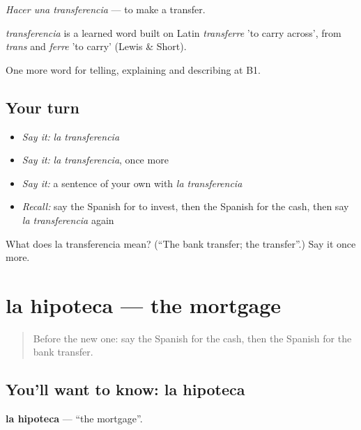 \emph{Hacer una transferencia} — to make a transfer.

\begin{cousinweb}
\emph{transferencia} is a learned word built on Latin \emph{transferre} 'to carry across', from \emph{trans} and \emph{ferre} 'to carry' (Lewis \& Short).
\end{cousinweb}

\begin{grammarlens}[title={What you've built}]
One more word for telling, explaining and describing at B1.
\end{grammarlens}

\subsection*{Your turn}
\begin{itemize}
\raggedright
  \item \emph{Say it:} \emph{la transferencia}
  \item \emph{Say it:} \emph{la transferencia}, once more
  \item \emph{Say it:} a sentence of your own with \emph{la transferencia}
  \item \emph{Recall:} say the Spanish for to invest, then the Spanish for the cash, then say \emph{la transferencia} again
\end{itemize}

\begin{tcolorbox}[breakable,colback=teal!4,colframe=teal!35!black,title={Before you move on}]
What does la transferencia mean? (\textquotedblleft{}The bank transfer; the transfer\textquotedblright{}.) Say it once more.
\end{tcolorbox}
\section[la hipoteca]{la hipoteca — the mortgage}

\label{lesson:ES-C628-hipoteca}



\begin{quote}
Before the new one: say the Spanish for the cash, then the Spanish for the bank transfer.
\end{quote}

\subsection*{You'll want to know: la hipoteca}
\textbf{la hipoteca} — \textquotedblleft{}the mortgage\textquotedblright{}.

